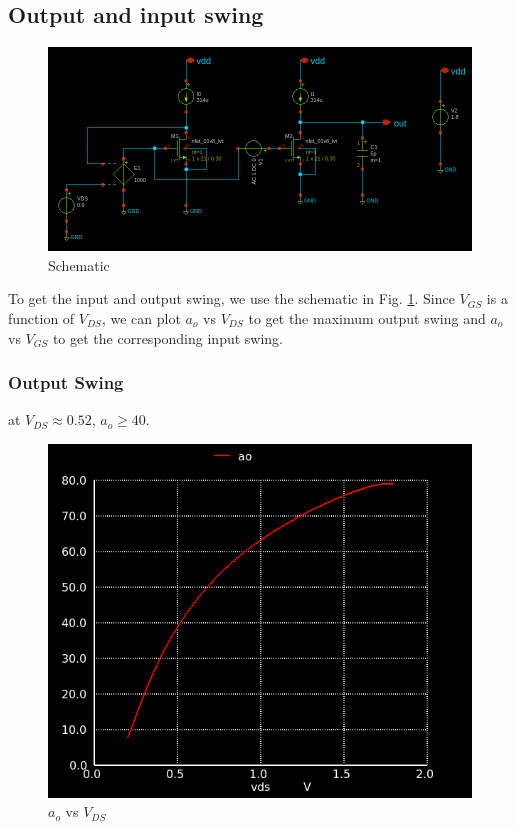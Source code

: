 \documentclass[conference]{IEEEtran}
\begin{document}
\subsection{Output and input swing}
\begin{figure}[H]
	\centering 
	\includegraphics[width=\columnwidth]{schem_large.png}
	\caption{Schematic}
	\label{schem-large}
\end{figure}
To get the input and output swing, we use the schematic in Fig. \ref{schem-large}. Since 
$V_{GS}$ is a function of $V_{DS}$, we can plot $a_o$ vs $V_{DS}$ to get the maximum output
swing and $a_o$ vs $V_{GS}$ to get the corresponding input swing. 

\vspace{8pt}
\subsubsection{Output Swing}
at $V_{DS}\approx 0.52$, $a_o \geq 40$. 
\begin{figure}[H]
	\centering 
	\includegraphics[scale=0.3]{ao-vds.png}
	\caption{$a_o$ vs $V_{DS}$}
	\label{swing-out}
\end{figure}
\end{document}
